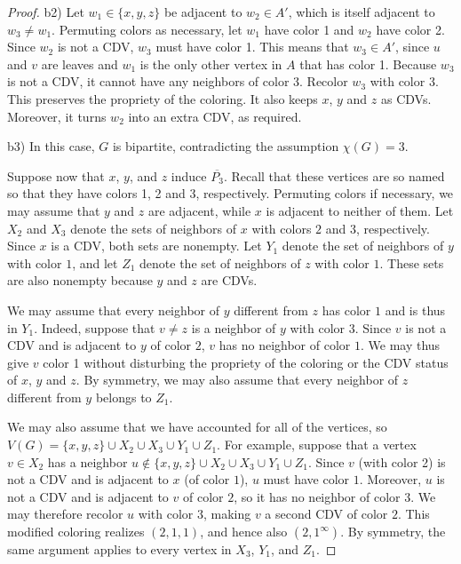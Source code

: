 \documentclass{article}
\theoremstyle{definition}
\begin{document}
\begin{proof}
b2)
Let $w_1\in\{x,y,z\}$ be adjacent to $w_2\in A'$, which is itself adjacent to $w_3\neq w_1$.
Permuting colors as necessary, let $w_1$ have color 1 and $w_2$ have color 2.
Since $w_2$ is not a CDV, $w_3$ must have color 1.
This means that $w_3\in A'$, since $u$ and $v$ are leaves and $w_1$ is the only other vertex in $A$ that has color 1.
Because $w_3$ is not a CDV, it cannot have any neighbors of color 3.
Recolor $w_3$ with color 3.
This preserves the propriety of the coloring.
It also keeps $x$, $y$ and $z$ as CDVs.
Moreover, it turns $w_2$ into an extra CDV, as required.

b3)
In this case, $G$ is bipartite, contradicting the assumption $\chi(G)=3$.

\smallskip

Suppose now that $x$, $y$, and $z$ induce $\overline{P_3}$.
Recall that these vertices are so named so that they have colors 1, 2 and 3, respectively.
Permuting colors if necessary, we may assume that $y$ and $z$ are adjacent, while $x$ is adjacent to neither of them.
Let $X_2$ and $X_3$ denote the sets of neighbors of $x$ with colors $2$ and $3$, respectively. Since $x$ is a CDV, both sets are nonempty. Let $Y_1$ denote the set of neighbors of $y$ with color $1$, and let $Z_1$ denote the set of neighbors of $z$ with color $1$. These sets are also nonempty because $y$ and $z$ are CDVs. 

We may assume that every neighbor of $y$ different from $z$ has color $1$ and is thus in $Y_1$.
Indeed, suppose that $v\neq z$ is a neighbor of $y$ with color $3$.
Since $v$ is not a CDV and is adjacent to $y$ of color $2$, $v$ has no neighbor of color $1$.
We may thus give $v$ color 1 without disturbing the propriety of the coloring or the CDV status of $x$, $y$ and $z$.
By symmetry, we may also assume that every neighbor of $z$ different from $y$ belongs to $Z_1$.

We may also assume that we have accounted for all of the vertices, so $V(G)=\{x,y,z\}\cup X_2\cup X_3\cup Y_1\cup Z_1$.
For example, suppose that a vertex $v\in X_2$ has a neighbor $u\notin \{x,y,z\}\cup X_2\cup X_3\cup Y_1\cup Z_1$. 
Since $v$ (with color 2) is not a CDV and is adjacent to $x$ (of color $1$), $u$ must have color $1$.
Moreover, $u$ is not a CDV and is adjacent to $v$ of color $2$, so it has no neighbor of color $3$. We may therefore recolor $u$ with color $3$, making $v$ a second CDV of color $2$. 
This modified coloring realizes $(2,1,1)$, and hence also $(2,1^\infty)$.
By symmetry, the same argument applies to every vertex in $X_3$, $Y_1$, and $Z_1$.


\end{proof}
\end{document}
